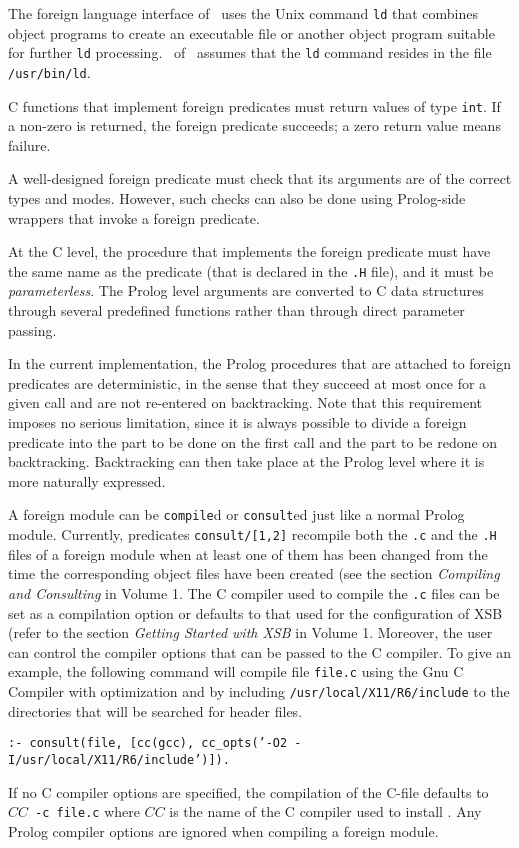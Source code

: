 The foreign language interface of \ourprolog\ uses the Unix command 
{\tt ld} that combines object programs to create an executable file  
or another object program suitable for further {\tt ld} processing.
\version\ of \ourprolog\ assumes that the {\tt ld} command resides
in the file {\tt /usr/bin/ld}.

C functions that implement foreign predicates must return values of type
{\tt int}. If a non-zero is returned, the foreign predicate succeeds; a
zero return value means failure.

A well-designed foreign predicate must check that its arguments are of the
correct types and modes. However, such checks can also be done using
Prolog-side wrappers that invoke a foreign predicate.

At the C level, the procedure that implements the foreign predicate
must have the same name as the predicate (that is declared in the 
{\tt *.H} file), and it must be {\em parameterless}.  The Prolog level 
arguments are converted to C data structures through several 
predefined functions rather than through direct parameter passing.


In the current implementation, the Prolog procedures that are
attached to foreign predicates are deterministic, in the sense that
they succeed at most once for a given call and are not re-entered on
backtracking.  Note that this requirement imposes no serious
limitation, since it is always possible to divide a foreign predicate
into the part to be done on the first call and the part to be redone
on backtracking.  Backtracking can then take place at the Prolog
level where it is more naturally expressed.

A foreign module can be {\tt compile}d or {\tt consult}ed just like a
normal Prolog module.  Currently, predicates {\tt consult/[1,2]}
recompile both the {\tt *.c} and the {\tt *.H} files of a foreign
module when at least one of them has been changed from the time the
corresponding object files have been created (see the section {\it
Compiling and Consulting} in Volume 1. 
The C compiler used to compile the {\tt *.c} files can be set as a
compilation option or defaults to that used for the configuration of
XSB (refer to the section {\it Getting Started with XSB} in Volume 1.
Moreover, the user can control the compiler options that can be passed
to the C compiler.  To give an example, the following command will
compile file {\tt file.c} using the Gnu C Compiler with optimization
and by including {\tt /usr/local/X11/R6/include} to the directories that
will be searched for header files.
\begin{center}
{\tt  :- consult(file,
                 [cc(gcc), cc\_opts('-O2 -I/usr/local/X11/R6/include')]). }
\end{center}
If no C compiler options are specified, the compilation of the C-file
defaults to $CC$~{\tt -c~file.c} where $CC$ is the name of the C compiler
used to install \ourprolog.
Any Prolog compiler options are ignored when compiling a foreign module.


